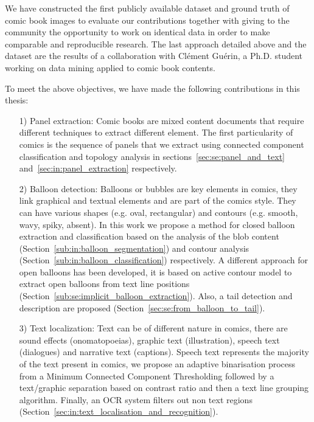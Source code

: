 We have constructed the first publicly available dataset and ground truth of comic book images to evaluate our contributions together with giving to the community the opportunity to work on identical data in order to make comparable and reproducible research.
The last approach detailed above and the dataset are the results of a collaboration with Cl{\'e}ment Gu{\'e}rin, a Ph.D. student working on data mining applied to comic book contents.

To meet the above objectives, we have made the following contributions in this thesis:

\begin{itemize}
	
	\item [1)] Panel extraction: Comic books are mixed content documents that require different techniques to extract different element.
	The first particularity of comics is the sequence of panels that we extract using connected component classification and topology analysis in sections~\ref{sec:se:panel_and_text} and~\ref{sec:in:panel_extraction} respectively.
	
	\item [2)] Balloon detection: Balloons or bubbles are key elements in comics,
	they link graphical and textual elements and are part of the comics style. They can have various shapes (e.g. oval, rectangular) and contours (e.g. smooth, wavy, spiky, absent).
	In this work we propose a method for closed balloon extraction and classification based on the analysis of the blob content (Section~\ref{sub:in:balloon_segmentation}) and contour analysis (Section~\ref{sub:in:balloon_classification}) respectively.
	A different approach for open balloons has been developed, it is based on active contour model to extract open balloons from text line positions (Section~\ref{sub:se:implicit_balloon_extraction}).
	Also, a tail detection and description are proposed (Section~\ref{sec:se:from_balloon_to_tail}).

	\item [3)] Text localization: Text can be of different nature in comics, there are sound effects (onomatopoeias), graphic text (illustration), speech text (dialogues) and narrative text (captions).
	Speech text represents the majority of the text present in comics, we propose an adaptive binarisation process from a Minimum Connected Component Thresholding followed by a text/graphic separation based on contrast ratio and then a text line grouping algorithm.
	Finally, an OCR system filters out non text regions (Section~\ref{sec:in:text_localisation_and_recognition}).


\end{itemize}
